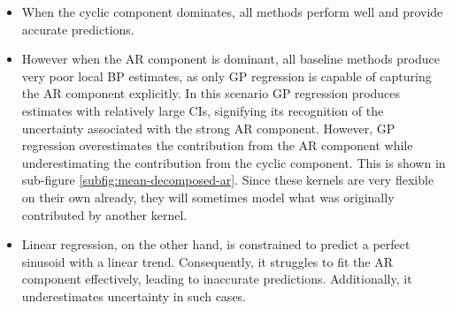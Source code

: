 \begin{itemize}
    \item When the cyclic component dominates, all methods perform well and provide accurate predictions.
    \item However when the AR component is dominant, all baseline methods produce very poor local BP
    estimates, as only GP regression is capable of capturing the AR component explicitly.
    In this scenario GP regression produces estimates with relatively
    large CIs, signifying its recognition of the uncertainty associated with the strong AR component.
    However, GP regression overestimates the contribution from the AR component
    while underestimating the contribution
    from the cyclic component.
    This is shown in sub-figure \ref{subfig:mean-decomposed-ar}.
    Since these kernels are very flexible on their own already, they will sometimes
    model what was originally contributed by another kernel.
    \item Linear regression, on the other hand, is constrained
    to predict a perfect sinusoid with a linear trend.
    Consequently, it struggles to fit the AR component effectively, leading to inaccurate predictions.
    Additionally, it underestimates uncertainty in such cases.
\end{itemize}


